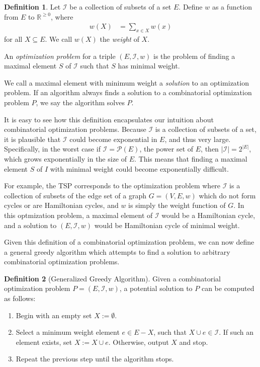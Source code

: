 \documentclass[a4paper,11pt]{report}
\theoremstyle{plain}
\theoremstyle{definition}
\newtheorem{defn}[defn]{Definition}
\newcommand{\I}{\mathcal{I}}
\begin{document}
\begin{defn}
Let $\I$ be a collection of subsets of a set $E$. Define $w$ as a function from
$E$ to $\mathbb{R}^{\geq 0}$, where
\begin{align*}
w(X) &= \sum_{x \in X}{w(x)}
\end{align*}
for all $X \subseteq E$. We call $w(X)$ the \emph{weight} of $X$.

An \emph{optimization problem} for a triple $(E,\I,w)$ is the problem of finding a
maximal element $S$ of $\I$ such that $S$ has minimal weight.
\end{defn}

We call a maximal element with minimum weight a \emph{solution} to an
optimization problem. If an algorithm always finds a solution to a
combinatorial optimization problem $P$, we say the algorithm solves $P$.

It is easy to see how this definition encapsulates our intuition about
combinatorial optimization problems. Because $\I$ is a collection of subsets of
a set, it is plausible that $\I$ could become exponential in $E$, and thus very
large. Specifically, in the worst case if $\I = \mathcal{P}(E)$, the power set
of $E$, then $|\I| = 2^{|E|}$, which grows exponentially in the size of $E$.
This means that finding a maximal element $S$ of $I$ with minimal weight could
become exponentially difficult.

For example, the TSP corresponds to the optimization problem where $\I$ is a
collection of subsets of the edge set of a graph $G = (V,E,w)$ which do not
form cycles or are Hamiltonian cycles, and $w$ is simply the weight function of
$G$. In this optmization problem, a maximal element of $\I$ would be a
Hamiltonian cycle, and a solution to $(E,\I,w)$ would be Hamiltonian cycle of
minimal weight.

Given this definition of a combinatorial optimization problem, we can now
define a general greedy algorithm which attempts to find a solution to
arbitrary combinatorial optimization problems.

\begin{defn}[Generalized Greedy Algorithm]
Given a combinatorial optimization problem $P = (E,\I,w)$, a potential solution
to $P$ can be computed as follows:

\begin{enumerate}
    \item Begin with an empty set $X := \emptyset$.
    \item Select a minimum weight element $e \in E - X$, such that $X \cup e
          \in \I$. If such an element exists, set $X := X \cup e$. Otherwise,
          output $X$ and stop.
    \item Repeat the previous step until the algorithm stops.
\end{enumerate}
\end{defn}
\end{document}
